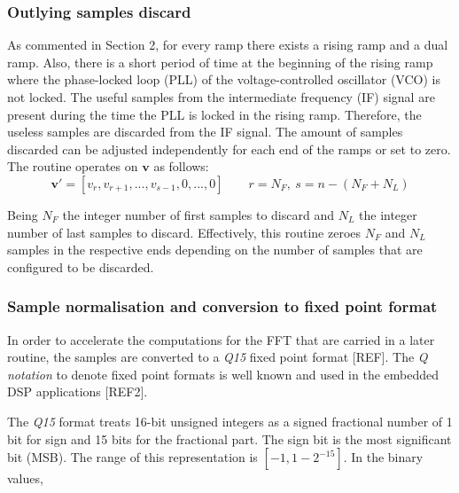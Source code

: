 \subsubsection{Outlying samples discard}

As commented in Section 2, for every ramp there exists a rising ramp and a dual ramp. Also, there is a short period of time at the beginning of the rising ramp where the phase-locked loop (PLL) of the voltage-controlled oscillator (VCO) is not locked. The useful samples from the intermediate frequency (IF) signal are present during the time the PLL is locked in the rising ramp. Therefore, the useless samples are discarded from the IF signal. The amount of samples discarded can be adjusted independently for each end of the ramps or set to zero. The routine operates on $\mathbf{v}$ as follows:
\begin{equation}
	\mathbf{v'} = [v_{r}, v_{r+1}, ..., v_{s-1}, 0, ..., 0] \qquad r = N_F,\ s= n- (N_F+N_L)
\end{equation}

Being $N_F$ the integer number of first samples to discard and $N_L$ the integer number of last samples to discard. Effectively, this routine zeroes $N_F$ and $N_L$ samples in the respective ends depending on the number of samples that are configured to be discarded. %



\subsubsection{Sample normalisation and conversion to fixed point format}

In order to accelerate the computations for the FFT that are carried in a later routine, the samples are converted to a \textit{Q15} fixed point format [REF]. The \textit{Q notation} to denote fixed point formats is well known and used in the embedded DSP applications [REF2].

The \textit{Q15} format treats 16-bit unsigned integers as a signed fractional number of 1 bit for sign and 15 bits for the fractional part. The sign bit is the most significant bit (MSB). The range of this representation is $[-1, 1-2^{-15}]$. In the binary values,

